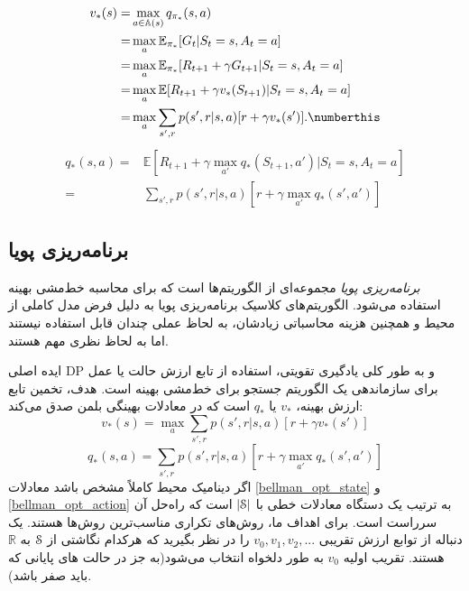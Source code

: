\begin{align}
  v_{*}(s)= &\max_{a \in \mathbb{A}(s)} q_{\pi_*}(s,a) \nonumber \\
      =& \max_{a} \mathbb{E}_{\pi_*} [G_t|S_t=s, A_t=a] \nonumber \\ 
      =& \max_{a} \mathbb{E}_{\pi_*} [R_{t+1} + \gamma G_{t+1} | S_t=s, A_t=a] \nonumber \\ 
      =& \max_{a} \mathbb{E} [R_{t+1} + \gamma v_*(S_{t+1}) | S_t= s, A_t = a] \nonumber \\
      =& \max_{a} \sum_{s',r} p(s',r|s,a) [r + \gamma v_*(s')]. \numberthis
\label{eq:bellman-opti}
\end{align}
\begin{align}
q_*(s,a) =& \mathbb{E}\left[R_{t+1} + \gamma \max_{a'} q_*(S_{t+1},a')| S_t=s, A_t=a \right] \nonumber\\
=& \sum_{s',r} p(s',r|s,a) \left[r + \gamma \max_{a'} q_*(s',a')\right] 
\label{eq:2}
\end{align}

\subsection{برنامه‌ریزی پویا}
\textit{برنامه‌ریزی پویا}   مجموعه‌ای از الگوریتم‌ها است که برای محاسبه خط‌مشی بهینه استفاده می‌شود.
الگوریتم‌های کلاسیک برنامه‌ریزی پویا به دلیل فرض
مدل کاملی از محیط و همچنین هزینه محاسباتی زیادشان، به لحاظ عملی چندان قابل استفاده نیستند اما به لحاظ نظری مهم هستند.

ایده اصلی DP و به طور کلی یادگیری تقویتی‌، استفاده از تابع ارزش حالت یا عمل برای سازماندهی یک الگوریتم جستجو برای خط‌مشی بهینه است.
هدف، تخمین تابع ارزش بهینه،
$v_*$
یا
$q_*$
است
که در معادلات بهینگی بلمن صدق می‌کند:
\begin{equation}
v_{*}(s) = \max_{a} \sum_{s',r} p(s',r | s,a)[r + \gamma v_*(s')]
\label{bellman_opt_state}
\end{equation}
\begin{equation}
q_{*}(s,a) = \sum_{s',r} p(s',r | s,a)[r + \gamma \max_{a'} q_* (s',a')]
\label{bellman_opt_action}
\end{equation}
اگر دینامیک محیط کاملاً مشخص باشد معادلات 
\ref{bellman_opt_state}
و
\ref{bellman_opt_action}
به ترتیب یک دستگاه معادلات خطی با
 $|\EuScript{S}|$
  است
 که راه‌حل آن سرراست است.
 برای اهداف ما، روش‌های تکراری مناسب‌ترین روش‌ها هستند. یک دنباله 
از توابع ارزش تقریبی
$ v_0 , v_1 , v_2 , ...$ 
را در نظر بگیرید که هرکدام نگاشتی از
$\EuScript{S}$ 
به 
$\mathbb{R}$
 هستند.
تقریب اولیه $v_0$
به طور دلخواه انتخاب می‌شود(به جز در حالت های پایانی که باید صفر باشد).

